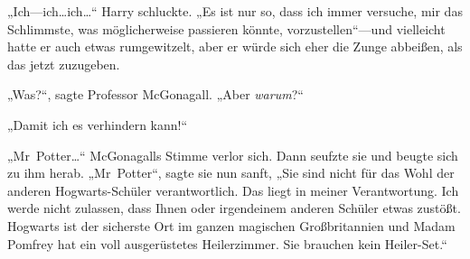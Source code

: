 
„Ich—ich…ich…“ Harry schluckte. „Es ist nur so, dass ich immer versuche, mir das Schlimmste, was möglicherweise passieren könnte, vorzustellen“—und vielleicht hatte er auch etwas rumgewitzelt, aber er würde sich eher die Zunge abbeißen, als das jetzt zuzugeben.

„Was?“, sagte Professor McGonagall. „Aber \emph{warum}?“

„Damit ich es verhindern kann!“

„Mr~Potter…“ McGonagalls Stimme verlor sich. Dann seufzte sie und beugte sich zu ihm herab. „Mr~Potter“, sagte sie nun sanft, „Sie sind nicht für das Wohl der anderen Hogwarts-Schüler verantwortlich. Das liegt in meiner Verantwortung. Ich werde nicht zulassen, dass Ihnen oder irgendeinem anderen Schüler etwas zustößt. Hogwarts ist der sicherste Ort im ganzen magischen Großbritannien und Madam Pomfrey hat ein voll ausgerüstetes Heilerzimmer. Sie brauchen kein Heiler-Set.“


